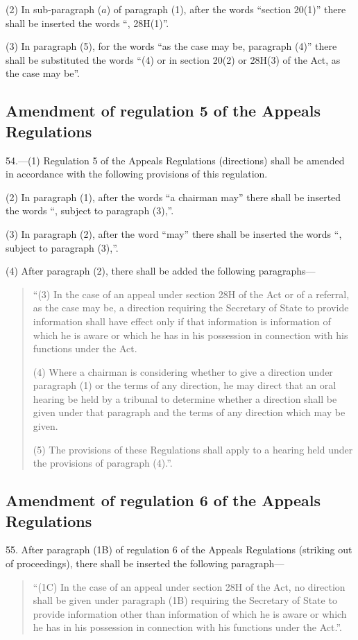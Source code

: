 \documentclass[a4paper]{article}
\begin{document}
(2) In sub-paragraph ($a$) of paragraph (1), after the words “section 20(1)” there
shall be inserted the words “, 28H(1)”.

(3) In paragraph (5), for the words “as the case may be, paragraph (4)” there
shall be substituted the words “(4) or in section 20(2) or 28H(3) of the Act, as
the case may be”.

\subsection[54. Amendment of regulation 5 of the Appeals Regulations]{Amendment of regulation 5 of the Appeals Regulations}

54.—(1) Regulation 5 of the
Appeals Regulations (directions) shall be amended in accordance with the
following provisions of this regulation.

(2) In paragraph (1), after the words “a chairman may” there shall be inserted
the words “, subject to paragraph (3),”.

(3) In paragraph (2), after the word “may” there shall be inserted the words “,
subject to paragraph (3),”.

(4) After paragraph (2), there shall be added the following paragraphs—
\begin{quotation}
“(3) In the case of an appeal under section 28H of the Act or of a referral, as
the case may be, a direction requiring the Secretary of State to provide
information shall have effect only if that information is information of which
he is aware or which he has in his possession in connection with his functions
under the Act.

(4) Where a chairman is considering whether to give a direction under paragraph
(1) or the terms of any direction, he may direct that an oral hearing be held by
a tribunal to determine whether a direction shall be given under that paragraph
and the terms of any direction which may be given.

(5) The provisions of these Regulations shall apply to a hearing held under the
provisions of paragraph (4).”.
\end{quotation}

\subsection[55. Amendment of regulation 6 of the Appeals Regulations]{Amendment of regulation 6 of the Appeals Regulations}

55. After paragraph (1B) of
regulation 6 of the Appeals Regulations (striking out of proceedings), there
shall be inserted the following paragraph—
\begin{quotation}
“(1C) In the case of an appeal under section 28H of the Act, no direction shall
be given under paragraph (1B) requiring the Secretary of State to provide
information other than information of which he is aware or which he has in his
possession in connection with his functions under the Act.”.
\end{quotation}
\end{document}
